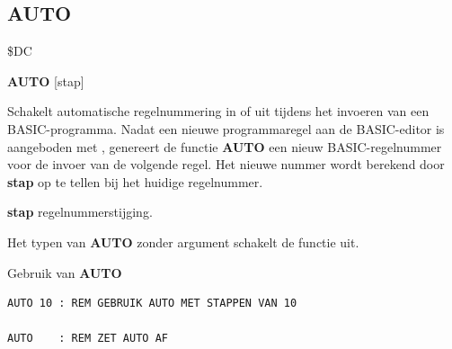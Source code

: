 \subsection{AUTO}
\begin{description}[leftmargin=2cm,style=nextline]
\item [Token:]    \$DC

\item [Formaat:]   {\bf AUTO} [stap]

\item [Gebruik:]    Schakelt automatische regelnummering in of uit tijdens het invoeren van een BASIC-programma. Nadat een nieuwe programmaregel aan de BASIC-editor is aangeboden met , genereert de functie {\bf AUTO} een nieuw BASIC-regelnummer voor de invoer van de volgende regel. Het nieuwe nummer wordt berekend door {\bf stap} op te tellen bij het huidige regelnummer.

                  {\bf stap} regelnummerstijging.

                  Het typen van {\bf AUTO} zonder argument schakelt de functie uit.

\item [Voorbeelden:] Gebruik van {\bf AUTO}

\begin{tcolorbox}[colback=black,coltext=white]
\verbatimfont{\codefont}
\begin{verbatim}
AUTO 10 : REM GEBRUIK AUTO MET STAPPEN VAN 10

AUTO    : REM ZET AUTO AF
\end{verbatim}
\end{tcolorbox}
\end{description}


\newpage
